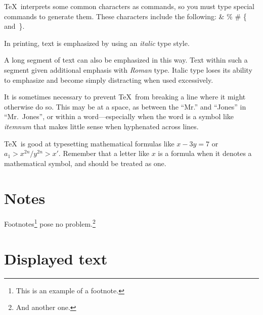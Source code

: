 \documentclass[fist]{svjour3}
\begin{document}
\TeX\ interprets some common characters as commands, so you must type
special commands to generate them.  These characters include the
following:
        \& \% \# \{ and~\}.

In printing, text is emphasized by using an
       {\em italic\/}  %
type style.

\begin{em}
   A long segment of text can also be emphasized in this way.  Text within
   such a segment given additional emphasis
      with\/ {\em Roman}
   type.  Italic type loses its ability to emphasize and become simply
   distracting when used excessively.
\end{em}

It is sometimes necessary to prevent \TeX\ from breaking a line where
it might otherwise do so.  This may be at a space, as between the
``Mr.'' and ``Jones'' in
       ``Mr.~Jones'',        %
or within a word---especially when the word is a symbol like
       \mbox{\em itemnum\/}
that makes little sense when hyphenated across
       lines.

\TeX\ is good at typesetting mathematical formulas like
\( x-3y = 7 \)
or \( a_{1} > x^{2n} / y^{2n} > x' \).
Remember that a letter like
       $x$        %
is a formula when it denotes a mathematical symbol, and should
be treated as one.


\section{Notes}
Footnotes\footnote{This is an example of a footnote.}
pose no problem.\footnote{And another one.}

\section{Displayed text}
\end{document}
